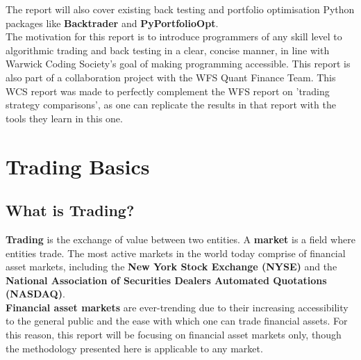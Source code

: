 \documentclass[11pt]{article}
\begin{document}
The report will also cover existing back testing and portfolio optimisation Python packages like \textbf{Backtrader} and \textbf{PyPortfolioOpt}.\\

The motivation for this report is to introduce programmers of any skill level to algorithmic trading and back testing in a clear, concise manner, in line with Warwick Coding Society's goal of making programming accessible. 
\nolinebreak
This report is also part of a collaboration project with the WFS Quant Finance Team. 
\nolinebreak
This WCS report was made to perfectly complement the WFS report on 'trading strategy comparisons', as one can replicate the results in that report with the tools they learn in this one.

\section{Trading Basics}

\subsection{What is Trading?}

\textbf{Trading} is the exchange of value between two entities.
\nolinebreak
A \textbf{market} is a field where entities trade.
\nolinebreak
The most active markets in the world today comprise of financial asset markets, including the \textbf{New York Stock Exchange (NYSE)} and the \textbf{National Association of Securities Dealers Automated Quotations (NASDAQ)}.\\

\textbf{Financial asset markets} are ever-trending due to their increasing accessibility to the general public and the ease with which one can trade financial assets. 
\nolinebreak
For this reason, this report will be focusing on financial asset markets only, though the methodology presented here is applicable to any market.\\
\end{document}
